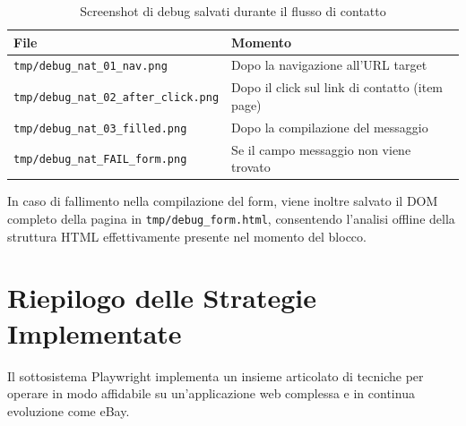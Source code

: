 \begin{table}[htbp]
\centering
\caption{Screenshot di debug salvati durante il flusso di contatto}
\label{tab:pw-debug-shots}
\begin{tabular}{ll}
\hline
\textbf{File} & \textbf{Momento} \\
\hline
\texttt{tmp/debug\_nat\_01\_nav.png}   & Dopo la navigazione all'URL target \\
\texttt{tmp/debug\_nat\_02\_after\_click.png} & Dopo il click sul link di contatto (item page) \\
\texttt{tmp/debug\_nat\_03\_filled.png} & Dopo la compilazione del messaggio \\
\texttt{tmp/debug\_nat\_FAIL\_form.png} & Se il campo messaggio non viene trovato \\
\hline
\end{tabular}
\end{table}

In caso di fallimento nella compilazione del form, viene inoltre
salvato il DOM completo della pagina in \texttt{tmp/debug\_form.html},
consentendo l'analisi offline della struttura HTML effettivamente
presente nel momento del blocco.


\section{Riepilogo delle Strategie Implementate}
\label{sec:pw-summary}

Il sottosistema Playwright implementa un insieme articolato di
tecniche per operare in modo affidabile su un'applicazione web
complessa e in continua evoluzione come eBay.

